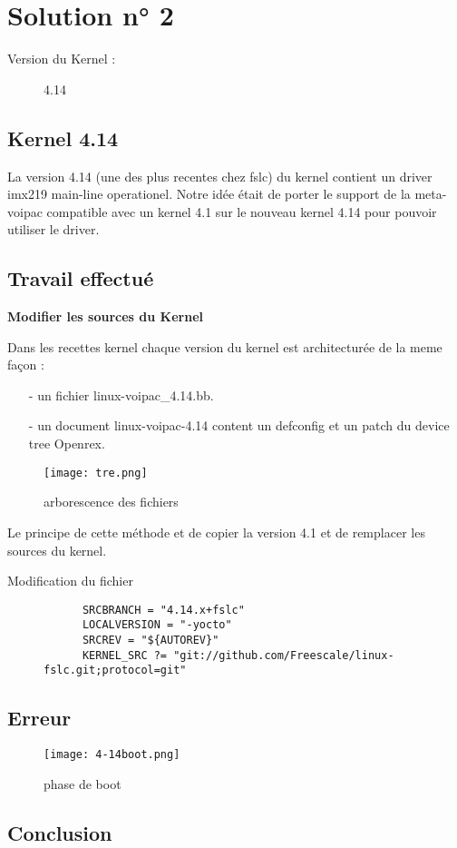 
\chapter{Solution n° 2} %

\label{Chapter3} %
\begin{description}
  \item[Version du Kernel :] 4.14
\end{description}

\section{Kernel 4.14}
La version 4.14 (une des plus recentes chez fslc) du kernel contient un driver imx219
main-line operationel. Notre idée était de porter le support de la meta-voipac compatible
avec un kernel 4.1 sur le nouveau kernel 4.14 pour pouvoir utiliser le driver.

\section{Travail effectué}
\textbf{Modifier les sources du Kernel}

 Dans les recettes kernel chaque version du kernel est architecturée de la meme façon :
  \begin{itemize}
  \item[-] un fichier linux-voipac\_4.14.bb.
  \item[-] un document linux-voipac-4.14 content un defconfig et un patch du device tree Openrex.
  \end{itemize}

\begin{figure}[th]
  \centering
  \texttt{[image: tre.png]}
  \decoRule
  \caption{arborescence des fichiers}  \label{fig:planning}
\end{figure}

Le principe de cette méthode et de copier la version 4.1 et de remplacer les sources du kernel. 

\begin{description}
  \item[Modification du fichier]
    \begin{lstlisting}
      SRCBRANCH = "4.14.x+fslc"
      LOCALVERSION = "-yocto"
      SRCREV = "${AUTOREV}"
      KERNEL_SRC ?= "git://github.com/Freescale/linux-fslc.git;protocol=git"
    \end{lstlisting}
\end{description}

\section{Erreur}

\begin{figure}[th]
  \centering
  \texttt{[image: 4-14boot.png]}
  \decoRule
  \caption{phase de boot}  \label{fig:planning}
\end{figure}

\section{Conclusion}


